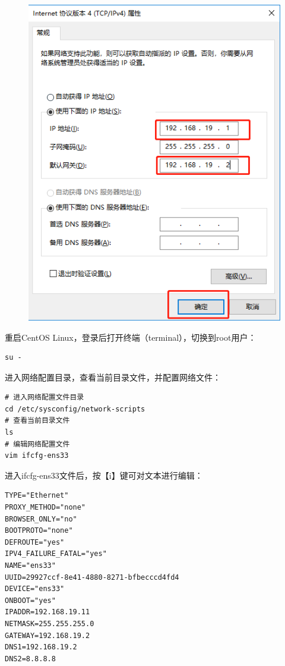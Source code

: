 \documentclass[12pt, openany, oneside]{book}
\begin{document}
\begin{figure}[H]
	\centering
	\includegraphics[scale=0.6]{img/C1/1-4/10.png}
\end{figure}

重启CentOS Linux，登录后打开终端（terminal），切换到root用户：

\vspace{-0.5cm}
\begin{lstlisting}
su -
\end{lstlisting}

进入网络配置目录，查看当前目录文件，并配置网络文件：

\vspace{-0.5cm}
\begin{lstlisting}
# 进入网络配置文件目录
cd /etc/sysconfig/network-scripts
# 查看当前目录文件
ls
# 编辑网络配置文件
vim ifcfg-ens33
\end{lstlisting}

进入ifcfg-ens33文件后，按【i】键可对文本进行编辑：

\vspace{-0.5cm}
\begin{lstlisting}
TYPE="Ethernet"
PROXY_METHOD="none"
BROWSER_ONLY="no"
BOOTPROTO="none"
DEFROUTE="yes"
IPV4_FAILURE_FATAL="yes"
NAME="ens33"
UUID=29927ccf-8e41-4880-8271-bfbecccd4fd4
DEVICE="ens33"
ONBOOT="yes"
IPADDR=192.168.19.11
NETMASK=255.255.255.0
GATEWAY=192.168.19.2
DNS1=192.168.19.2
DNS2=8.8.8.8
\end{lstlisting}
\end{document}
